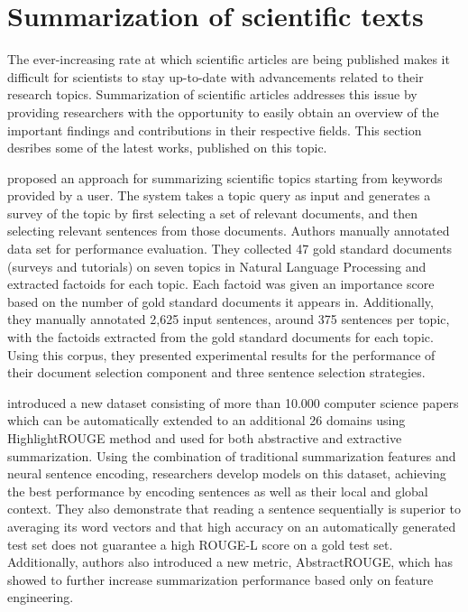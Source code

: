\documentclass[11pt,a4paper,onecolumn]{article}
\begin{document}
\section{Summarization of scientific texts}
The ever-increasing rate at which scientific articles are being published makes it difficult for scientists to stay up-to-date with advancements related to their research topics.
Summarization of scientific articles addresses this issue by providing researchers with the opportunity to easily obtain an overview of the important findings and contributions in their respective fields.
This section desribes some of the latest works, published on this topic.

 proposed an approach for summarizing scientific topics starting from keywords provided by a user.
The system takes a topic query as input and generates a survey of the topic by first selecting a set of relevant documents, and then selecting relevant sentences from those documents.
Authors manually annotated data set for performance evaluation.
They collected 47 gold standard documents (surveys and tutorials) on seven topics in Natural Language Processing
and extracted factoids for each topic.
Each factoid was given an importance score based on the number of gold standard documents it appears in.
Additionally, they manually annotated 2,625 input sentences, around 375 sentences per topic, with the
factoids extracted from the gold standard documents for each topic.
Using this corpus, they presented experimental results for the performance of their document selection component and three sentence selection strategies.

 introduced a new dataset consisting of more than 10.000 computer science papers which can be automatically extended to an additional 26 domains using HighlightROUGE method and used for both abstractive and extractive summarization.
Using the combination of traditional summarization features and neural sentence encoding, researchers develop models on this dataset, achieving the best performance by encoding sentences as well as their local and global context.
They also demonstrate that reading a sentence sequentially is superior to averaging its word vectors and that high accuracy on an automatically generated test set does not guarantee a high ROUGE-L score on a gold test set.
Additionally, authors also introduced a new metric, AbstractROUGE, which has showed to further increase summarization performance based only on feature engineering.
\end{document}
